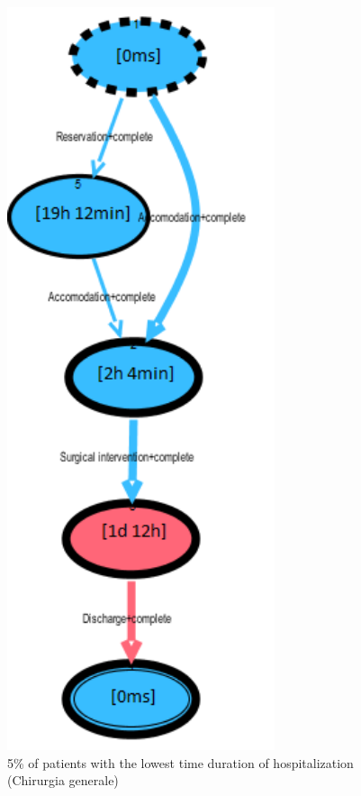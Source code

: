 \begin{figure} [htbp]
\begin{minipage}[t]{0.3\textwidth}
\includegraphics[width=0.7\textwidth]{RicoveriTransitionSystemSojourn0901Fast}
\caption{5\% of patients with the lowest time duration of hospitalization (Chirurgia generale)}
\end{minipage}

\end{figure}
